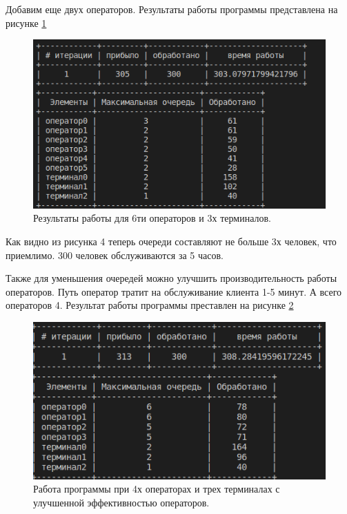 \documentclass[14pt]{extreport}
\begin{document}
Добавим еще двух операторов. Результаты работы программы представлена на рисунке \ref{img:res3}

\begin{figure}[H]
	\begin{center}
		\includegraphics[scale=1.0]{imgs/res3.png}
	\end{center}
	\caption{Результаты работы для 6ти операторов и 3х терминалов.}
	\label{img:res3}
\end{figure}

Как видно из рисунка 4 теперь очереди составляют не больше 3х человек, что приемлимо. 300 человек обслуживаются за 5 часов. 

Также для уменьшения очередей можно улучшить производительность работы операторов. Путь оператор тратит на обслуживание клиента 1-5 минут. А всего операторов 4. Результат работы программы преставлен на рисунке \ref{img:res4}

\begin{figure}[H]
	\begin{center}
		\includegraphics[scale=1.0]{imgs/res4.png}
	\end{center}
	\caption{Работа программы при 4х операторах и трех терминалах с улучшенной эффективностью операторов.}
	\label{img:res4}
\end{figure}
\end{document}
